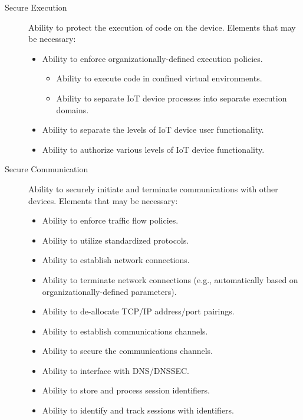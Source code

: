     \begin{description}
        \item[Secure Execution] Ability to protect the execution of code on the device. Elements that may be necessary:
        \begin{itemize}
            \item Ability to enforce organizationally-defined execution policies.
            \begin{itemize}
                \item Ability to execute code in confined virtual environments.
                \item Ability to separate IoT device processes into separate execution domains.
            \end{itemize}
            \item Ability to separate the levels of IoT device user functionality.
            \item Ability to authorize various levels of IoT device functionality.
        \end{itemize}
        
        
        \item[Secure Communication] Ability to securely initiate and terminate communications with other devices. Elements that may be necessary:
        \begin{itemize}
            \item Ability to enforce traffic flow policies.
            \item Ability to utilize standardized protocols.
            \item Ability to establish network connections.
            \item Ability to terminate network connections (e.g., automatically based on organizationally-defined parameters).
            \item Ability to de-allocate TCP/IP address/port pairings.
            \item Ability to establish communications channels.
            \item Ability to secure the communications channels.
            \item Ability to interface with DNS/DNSSEC.
            \item Ability to store and process session identifiers.
            \item Ability to identify and track sessions with identifiers.
        \end{itemize}
        

\end{description}
